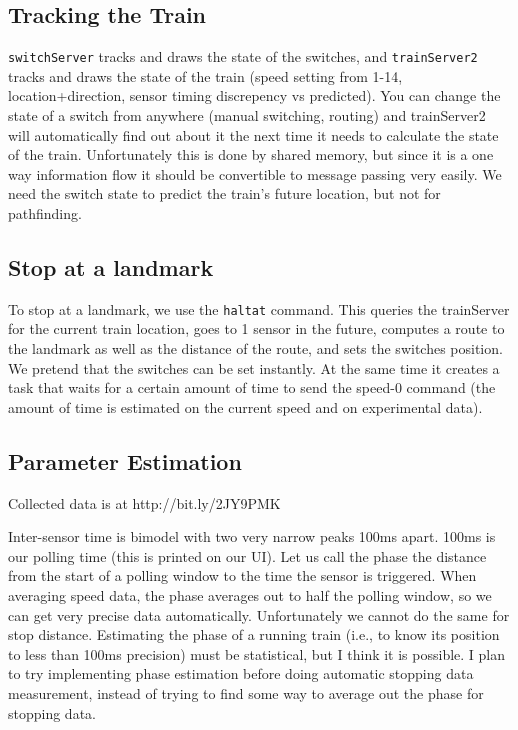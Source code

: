 \documentclass{article}
\begin{document}
\subsection*{Tracking the Train}

\texttt{switchServer} tracks and draws the state of the switches, and \texttt{trainServer2} tracks and draws the state of the train (speed setting from 1-14, location+direction, sensor timing discrepency vs predicted). You can change the state of a switch from anywhere (manual switching, routing) and trainServer2 will automatically find out about it the next time it needs to calculate the state of the train. Unfortunately this is done by shared memory, but since it is a one way information flow it should be convertible to message passing very easily. We need the switch state to predict the train's future location, but not for pathfinding.

\subsection*{Stop at a landmark}

To stop at a landmark, we use the \texttt{haltat} command. This queries the trainServer for the current train location, goes to 1 sensor in the future, computes a route to the landmark as well as the distance of the route, and sets the switches position. We pretend that the switches can be set instantly. At the same time it creates a task that waits for a certain amount of time to send the speed-0 command (the amount of time is estimated on the current speed and on experimental data).

\subsection*{Parameter Estimation}

Collected data is at http://bit.ly/2JY9PMK

Inter-sensor time is bimodel with two very narrow peaks 100ms apart. 100ms is our polling time (this is printed on our UI). Let us call the phase the distance from the start of a polling window to the time the sensor is triggered. When averaging speed data, the phase averages out to half the polling window, so we can get very precise data automatically. Unfortunately we cannot do the same for stop distance. Estimating the phase of a running train (i.e., to know its position to less than 100ms precision) must be statistical, but I think it is possible. I plan to try implementing phase estimation before doing automatic stopping data measurement, instead of trying to find some way to average out the phase for stopping data.
\end{document}
